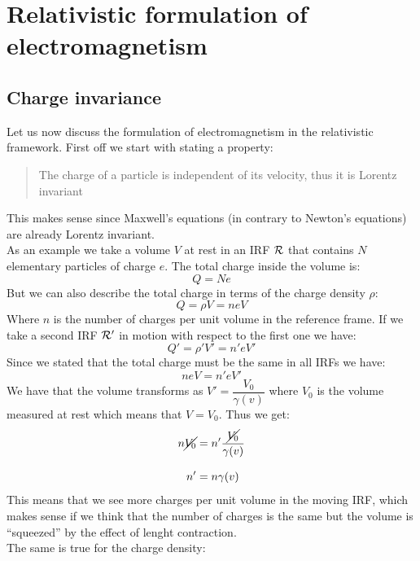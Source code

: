 \chapter[Relativistic EM]{Relativistic formulation of electromagnetism}
\section{Charge invariance}
Let us now discuss the formulation of electromagnetism in the relativistic framework. First off we start with stating a property:
\begin{quotation}
  The charge of a particle is independent of its velocity, thus it is Lorentz invariant
\end{quotation}
This makes sense since Maxwell's equations (in contrary to Newton's equations) are already Lorentz invariant.\\
As an example we take a volume $V$ at rest in an IRF $\mathcal{R}$ that contains $N$ elementary particles of charge $e$. The total charge inside the volume is:
\begin{equation}
  Q = Ne
\end{equation}
But we can also describe the total charge in terms of the charge density $\rho$:
\begin{equation}
  Q = \rho V = n e V
\end{equation}
Where $n$ is the number of charges per unit volume in the reference frame. If we take a second IRF $\mathcal{R}'$ in motion with respect to the first one we have:
\begin{equation}
  Q' = \rho'V' = n'eV'
\end{equation}
Since we stated that the total charge must be the same in all IRFs we have:
\begin{equation}
  n e V = n'eV'
\end{equation}
We have that the volume transforms as $V' = \dfrac{V_0}{\gamma(v)}$ where $V_0$ is the volume measured at rest which means that $V = V_0$. Thus we get:
\begin{equation}
  \begin{split}
    n \cancel{V_0} &= n' \dfrac{\cancel{V_0}}{\gamma(v)} \\[8pt]
    n' &= n\gamma(v)
  \end{split}
\end{equation}
This means that we see more charges per unit volume in the moving IRF, which makes sense if we think that the number of charges is the same but the volume is ``squeezed'' by the effect of lenght contraction.\\ The same is true for the charge density:
